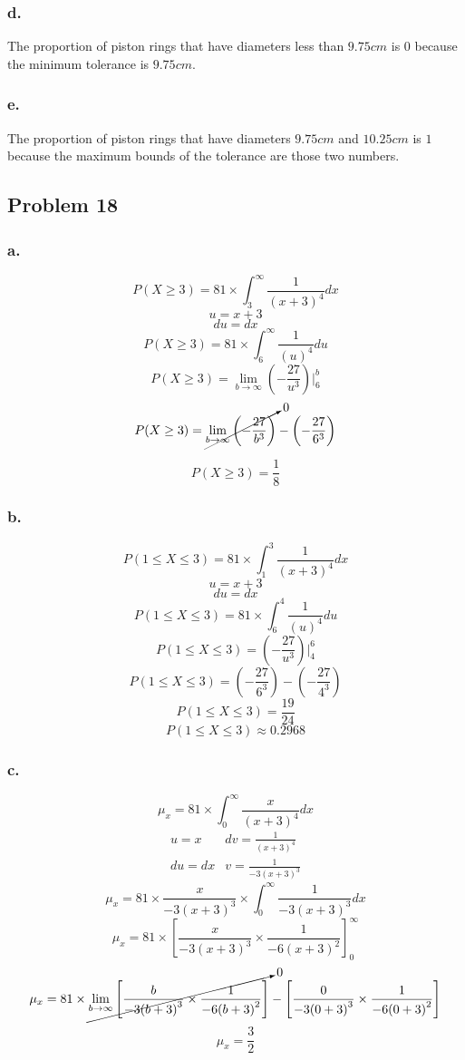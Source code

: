 \documentclass[11pt]{article}
\begin{document}
\subsubsection{d.}
The proportion of piston rings that have diameters less than $9.75 cm$ is $0$
because the minimum tolerance is $9.75 cm$. 

\subsubsection{e.}
The proportion of piston rings that have diameters $9.75 cm$ and $10.25 cm$ is
$1$ because the maximum bounds of the tolerance are those two numbers. 

\subsection{Problem 18}
\subsubsection{a.}
\[ P(X \ge 3) = 81 \times \int_{3}^{\infty} \frac{1}{{(x+3)}^4} dx \]
\[ u = x + 3 \]
\[ du = dx \]
\[ P(X \ge 3) = 81 \times \int_{6}^{\infty} \frac{1}{{(u)}^4} du \]
\[ P(X \ge 3) = \lim_{b \to \infty} \left( -\frac{27}{u^3} \right) \bigg \vert^b_6\]
\[ P(X \ge 3) = \cancelto{0}{\lim_{b \to \infty} \left( -\frac{27}{b^3} \right)}
              - \left( -\frac{27}{6^3} \right)\]

\[ P(X \ge 3) = \frac{1}{8} \]
\subsubsection{b.}
\[ P(1 \le X \le 3) = 81 \times \int_{1}^{3} \frac{1}{{(x+3)}^4} dx \]
\[ u = x + 3 \]
\[ du = dx \]
\[ P(1 \le X \le 3) = 81 \times \int_{6}^{4} \frac{1}{{(u)}^4} du \]
\[ P(1 \le X \le 3) = \left(- \frac{27}{u^3} \right) \bigg \vert_4^6 \]
\[ P(1 \le X \le 3) = \left(- \frac{27}{6^3} \right) - \left(- \frac{27}{4^3} \right) \]
\[ P(1 \le X \le 3) = \frac{19}{24} \]
\[ P(1 \le X \le 3) \approx 0.2968 \]

\subsubsection{c.}
\[ \mu_x = 81 \times \int_{0}^{\infty} \frac{x}{{(x+3)}^4} dx \]
\[
    \begin{array}{ll}
        u = x & dv = \frac{1}{{(x+3)}^4} \\
        du = dx & v = \frac{1}{-3{(x+3)}^3}
    \end{array} 
\]
\[ \mu_x = 81 \times \frac{x}{-3{(x+3)}^3} \times
            \int_{0}^{\infty} \frac{1}{-3{(x+3)}^3} dx \]
\[ \mu_x = 81 \times { \left[ \frac{x}{-3{(x+3)}^3} \times
    \frac{1}{-6{(x+3)}^2}\right] }_0^{\infty} \]
\[ \mu_x = 81 \times \cancelto{0}{\lim_{b \to \infty}  
        \left[ \frac{b}{-3{(b+3)}^3} \times \frac{1}{-6{(b+3)}^2}\right]
    } - {
        \left[ \frac{0}{-3{(0+3)}^3} \times \frac{1}{-6{(0+3)}^2}\right] 
    }
\]
\[ \mu_x = \frac{3}{2} \]
\end{document}
